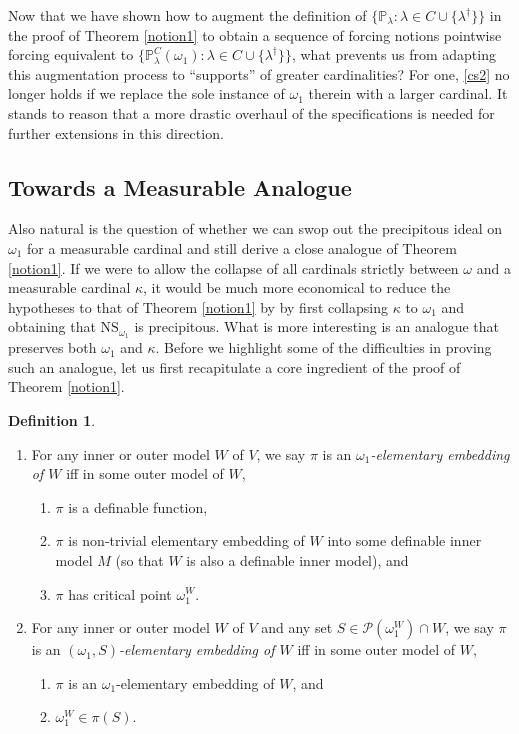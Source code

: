 \documentclass[12pt, twoside]{memoir}
\numberwithin{equation}{section}
\theoremstyle{definition}
\newtheorem{defi}[thm]{Definition}
\theoremstyle{remark}
\theoremstyle{definition}
\theoremstyle{definition}
\theoremstyle{definition}
\theoremstyle{remark}
\begin{document}
Now that we have shown how to augment the definition of $\{\mathbb{P}_{\lambda} : \lambda \in C \cup \{\lambda^{\dagger}\}\}$ in the proof of Theorem \ref{notion1} to obtain a sequence of forcing notions pointwise forcing equivalent to $\{\mathbb{P}^C_{\lambda}(\omega_1) : \lambda \in C \cup \{\lambda^{\dagger}\}\}$, what prevents us from adapting this augmentation process to ``supports'' of greater cardinalities? For one, \ref{cs2} no longer holds if we replace the sole instance of $\omega_1$ therein with a larger cardinal. It stands to reason that a more drastic overhaul of the specifications is needed for further extensions in this direction.

\subsection{Towards a Measurable Analogue}

Also natural is the question of whether we can swop out the precipitous ideal on $\omega_1$ for a measurable cardinal and still derive a close analogue of Theorem \ref{notion1}. If we were to allow the collapse of all cardinals strictly between $\omega$ and a measurable cardinal $\kappa$, it would be much more economical to reduce the hypotheses to that of Theorem \ref{notion1} by by first collapsing $\kappa$ to $\omega_1$ and obtaining that $\mathrm{NS}_{\omega_1}$ is precipitous. What is more interesting is an analogue that preserves both $\omega_1$ and $\kappa$. Before we highlight some of the difficulties in proving such an analogue, let us first recapitulate a core ingredient of the proof of Theorem \ref{notion1}.

\begin{defi}
\leavevmode
\begin{enumerate}[label=(\arabic*)]
    \item For any inner or outer model $W$ of $V$, we say $\pi$ is an \textit{$\omega_1$-elementary embedding of $W$} iff in some outer model of $W$,
    \begin{enumerate}[label=(\alph*)]
        \item $\pi$ is a definable function,
        \item $\pi$ is non-trivial elementary embedding of $W$ into some definable inner model $M$ (so that $W$ is also a definable inner model), and
        \item $\pi$ has critical point $\omega_1^W$.
    \end{enumerate}
    \item For any inner or outer model $W$ of $V$ and any set $S \in \mathcal{P}(\omega_1^W) \cap W$, we say $\pi$ is an \textit{$(\omega_1, S)$-elementary embedding of $W$} iff in some outer model of $W$,
    \begin{enumerate}[label=(\alph*)]
        \item $\pi$ is an $\omega_1$-elementary embedding of $W$, and
        \item $\omega_1^W \in \pi(S)$.
    \end{enumerate}
\end{enumerate}
\end{defi}
\end{document}
